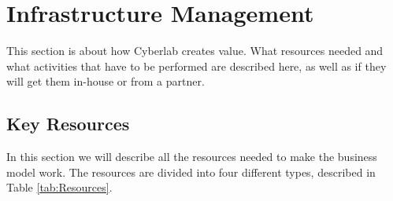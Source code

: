 \section{Infrastructure Management}
This section is about how Cyberlab creates value. What resources needed and what activities that have to be performed are described here, as well as if they will get them in-house or from a partner. 

\subsection{Key Resources}

In this section we will describe all the resources needed to make the business model work. The resources are divided into four different types, described in Table \ref{tab:Resources}.
\newpage

